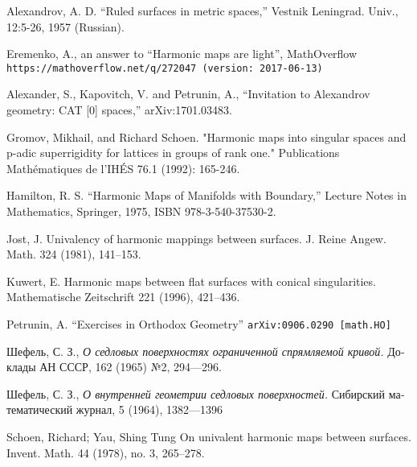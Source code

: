 \documentclass{article}
\begin{document}
\begin{thebibliography}{52}

 Alexandrov, A. D. ``Ruled  surfaces  in  metric  spaces,'' Vestnik Leningrad. Univ., 12:5-26, 1957 (Russian).

 Eremenko, A.,  
an answer to ``Harmonic maps are light'', MathOverflow
\texttt{https://mathoverflow.net/q/272047 (version: 2017-06-13)}

Alexander, S., Kapovitch, V. and Petrunin, A.,
``Invitation to Alexandrov geometry: CAT [0] spaces,''
arXiv:1701.03483.

 Gromov, Mikhail, and Richard Schoen. "Harmonic maps into singular spaces and p-adic superrigidity for lattices in groups of rank one." Publications Mathématiques de l'IHÉS 76.1 (1992): 165-246.

 Hamilton, R. S. ``Harmonic Maps of Manifolds with Boundary,'' Lecture Notes in Mathematics, Springer, 1975, ISBN 978-3-540-37530-2.

 Jost, J.
Univalency of harmonic mappings between surfaces.
J. Reine Angew. Math. 324 (1981), 141--153. 

 Kuwert, E.
Harmonic maps between flat surfaces with conical singularities. 
Mathematische Zeitschrift 221 (1996), 421--436.



 Petrunin, A. 
``Exercises in Orthodox Geometry''
{\tt arXiv:0906.0290 [math.HO]}

\begin{otherlanguage}{russian}
Шефель, С. З.,
\textit{О седловых поверхностях ограниченной спрямляемой кривой.}
Доклады АН СССР, 162 (1965) №2, 
294---296.
\end{otherlanguage}

\begin{otherlanguage}{russian}
Шефель, С. З., 
\textit{О внутренней геометрии седловых поверхностей.}
Сибирский математический журнал, 5 (1964), 1382---1396
\end{otherlanguage}

 Schoen, Richard; Yau, Shing Tung
On univalent harmonic maps between surfaces.
Invent. Math. 44 (1978), no. 3, 265--278. 

\end{thebibliography}
\end{document}
